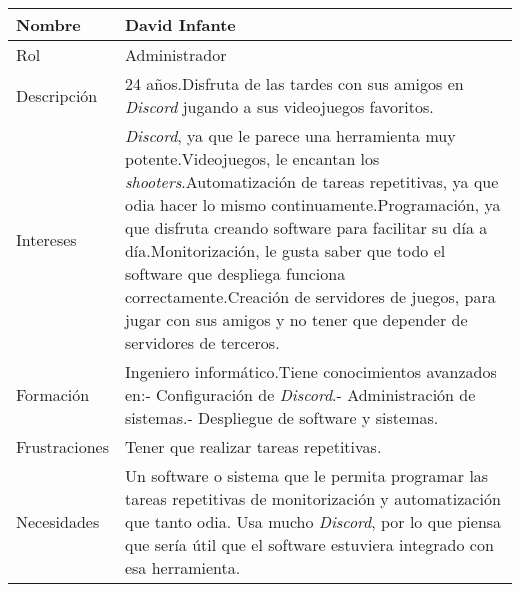 \begin{table}[H]
    \centering
    \begin{adjustbox}{max width=\textwidth}
    \begin{tabularx}{\textwidth}{|l|L|}
    	\hline
        Nombre & David Infante \\ \hline
        Rol & Administrador \\ \hline
        Descripción & 24 años.\linebreak Disfruta de las tardes con sus amigos en \textit{Discord} jugando a sus videojuegos favoritos. \\ \hline
        Intereses & \textit{Discord}, ya que le parece una herramienta muy potente.\linebreak Videojuegos, le encantan los \textit{shooters}.\linebreak Automatización de tareas repetitivas, ya que odia hacer lo mismo continuamente.\linebreak Programación, ya que disfruta creando software para facilitar su día a día.\linebreak Monitorización, le gusta saber que todo el software que despliega funciona correctamente.\linebreak Creación de servidores de juegos, para jugar con sus amigos y no tener que depender de servidores de terceros. \\ \hline
        Formación & Ingeniero informático.\linebreak Tiene conocimientos avanzados en:\linebreak - Configuración de \textit{Discord}.\linebreak - Administración de sistemas.\linebreak - Despliegue de software y sistemas. \\ \hline
        Frustraciones & Tener que realizar tareas repetitivas. \\ \hline
        Necesidades & Un software o sistema que le permita programar las tareas repetitivas de monitorización y automatización que tanto odia. Usa mucho \textit{Discord}, por lo que piensa que sería útil que el software estuviera integrado con esa herramienta. \\ \hline
    \end{tabularx}
    \end{adjustbox}
\end{table}


